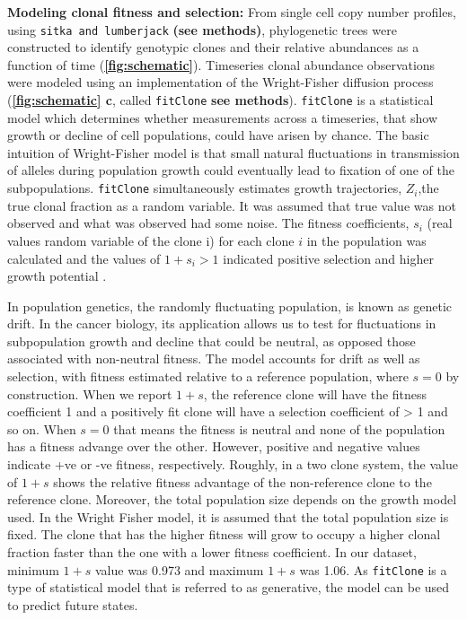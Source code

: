 \textbf{Modeling clonal fitness and selection:} 
From single cell copy number profiles, using \texttt{sitka and lumberjack} \textbf{(see methods)}, phylogenetic trees were constructed to identify genotypic clones and their relative abundances as a function of time (\textbf{\autoref{fig:schematic}}).
Timeseries clonal abundance observations were modeled using an implementation of the Wright-Fisher diffusion process  (\textbf{\autoref{fig:schematic} c}, called \texttt{fitClone} \textbf{see methods}). \texttt{fitClone} is a statistical model which determines whether measurements across a timeseries, that show growth or decline of cell populations, could have arisen by chance.
The basic intuition of Wright-Fisher model is that small natural fluctuations in transmission of alleles during population growth could eventually lead to fixation of one of the subpopulations. \texttt{fitClone} simultaneously estimates growth trajectories, $Z_i$,the true clonal fraction as a random variable. It was assumed that true value was not observed and what was observed had some noise. The fitness coefficients, $s_i$ (real values random variable of the clone i) for each clone $i$ in the population was calculated and the values of $1+s_i>1$ indicated positive selection and higher growth potential \cite{salichos2020estimating}. 

In population genetics, the randomly fluctuating population, is known as genetic drift. In the cancer biology, its application allows us to test for fluctuations in subpopulation growth and decline that could be neutral, as opposed those associated with non-neutral fitness. 
The model accounts for drift as well as selection, with fitness estimated relative to a reference population, where $s=0$ by construction. When we report $1 + s$, the reference clone will have the fitness coefficient 1 and a positively fit clone will have a selection coefficient of > 1 and so on.
When $s=0$ that means the fitness is neutral and none of the population has a fitness advange over the other. However, positive and negative values indicate +ve or -ve fitness, respectively. Roughly, in a two clone system, the value of $1 + s$ shows the relative fitness advantage of the non-reference clone to the reference clone. Moreover, the total population size depends on the growth model used. In the Wright Fisher model, it is assumed that the total population size is fixed. The clone that has the higher fitness will grow to occupy a higher clonal fraction faster than the one with a lower fitness coefficient. In our dataset, minimum $1 + s$ value was 0.973 and maximum $1 + s$ was 1.06. 
As \texttt{fitClone} is a type of statistical model that is referred to as generative, the model can be used to predict future states.

